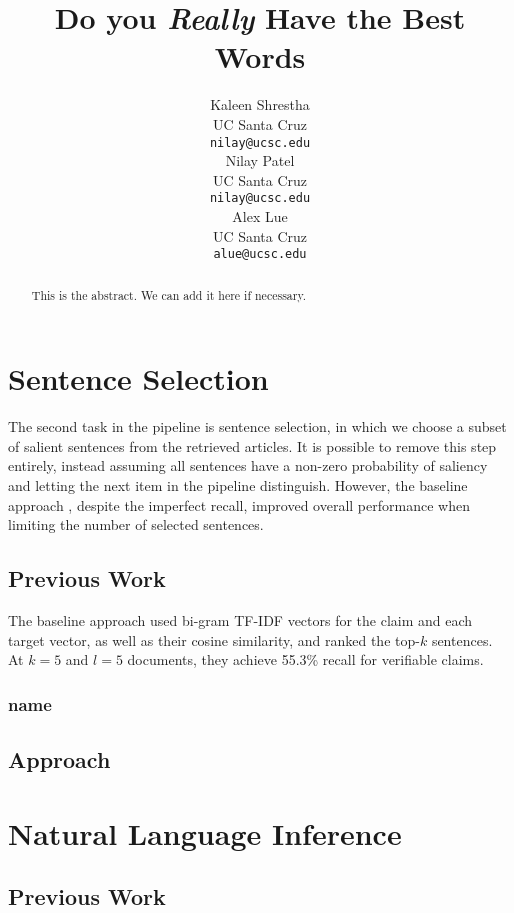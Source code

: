 \documentclass[11pt,a4paper]{article}
\title{Do you \textit{Really} Have the Best Words}
\author{Kaleen Shrestha \\
  UC Santa Cruz\\
  \texttt{nilay@ucsc.edu} \\\And%
  Nilay Patel \\
  UC Santa Cruz\\
  \texttt{nilay@ucsc.edu} \\\And%
  Alex Lue \\
  UC Santa Cruz\\
  \texttt{alue@ucsc.edu} \\
}
\date{}
\begin{document}
\maketitle
\begin{abstract}
  This is the abstract. We can add it here if necessary.
\end{abstract}

\section{Sentence Selection}%
\label{sec:sentence-selection}

The second task in the pipeline is sentence selection, in which we choose a
subset of salient sentences from the retrieved articles. It is possible to
remove this step entirely, instead assuming all sentences have a non-zero
probability of saliency and letting the next item in the pipeline distinguish.
However, the baseline approach \cite{fever2018}, despite the imperfect recall,
improved overall performance when limiting the number of selected sentences.

\subsection{Previous Work}%
\label{subsec:sentence-selection-prev-work}

The baseline approach used bi-gram TF-IDF vectors for the claim and each target
vector, as well as their cosine similarity, and ranked the top-$k$ sentences. At
$k=5$ and $l=5$ documents, they achieve 55.3\% recall for verifiable claims.

\subsubsection{name}%
\label{subsubsec:label}



\subsection{Approach}%
\label{subsec:sentence-selection-approach}



\section{Natural Language Inference}%
\label{sec:nli}

\subsection{Previous Work}%
\label{subsec:nli-prev-work}
\end{document}
